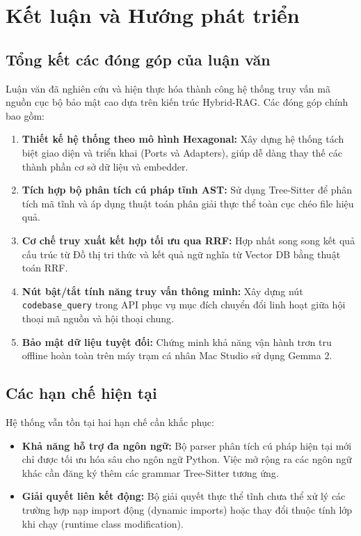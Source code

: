 \documentclass[12pt,a4paper,oneside]{report}
\begin{document}
\chapter{Kết luận và Hướng phát triển}

\section{Tổng kết các đóng góp của luận văn}
Luận văn đã nghiên cứu và hiện thực hóa thành công hệ thống truy vấn mã nguồn cục bộ bảo mật cao dựa trên kiến trúc Hybrid-RAG. Các đóng góp chính bao gồm:
\begin{enumerate}
    \item \textbf{Thiết kế hệ thống theo mô hình Hexagonal:} Xây dựng hệ thống tách biệt giao diện và triển khai (Ports và Adapters), giúp dễ dàng thay thế các thành phần cơ sở dữ liệu và embedder.
    \item \textbf{Tích hợp bộ phân tích cú pháp tĩnh AST:} Sử dụng Tree-Sitter để phân tích mã tĩnh và áp dụng thuật toán phân giải thực thể toàn cục chéo file hiệu quả.
    \item \textbf{Cơ chế truy xuất kết hợp tối ưu qua RRF:} Hợp nhất song song kết quả cấu trúc từ Đồ thị tri thức và kết quả ngữ nghĩa từ Vector DB bằng thuật toán RRF.
    \item \textbf{Nút bật/tắt tính năng truy vấn thông minh:} Xây dựng nút \texttt{codebase\_query} trong API phục vụ mục đích chuyển đổi linh hoạt giữa hội thoại mã nguồn và hội thoại chung.
    \item \textbf{Bảo mật dữ liệu tuyệt đối:} Chứng minh khả năng vận hành trơn tru offline hoàn toàn trên máy trạm cá nhân Mac Studio sử dụng Gemma 2.
\end{enumerate}

\section{Các hạn chế hiện tại}
Hệ thống vẫn tồn tại hai hạn chế cần khắc phục:
\begin{itemize}
    \item \textbf{Khả năng hỗ trợ đa ngôn ngữ:} Bộ parser phân tích cú pháp hiện tại mới chỉ được tối ưu hóa sâu cho ngôn ngữ Python. Việc mở rộng ra các ngôn ngữ khác cần đăng ký thêm các grammar Tree-Sitter tương ứng.
    \item \textbf{Giải quyết liên kết động:} Bộ giải quyết thực thể tĩnh chưa thể xử lý các trường hợp nạp import động (dynamic imports) hoặc thay đổi thuộc tính lớp khi chạy (runtime class modification).
\end{itemize}
\end{document}
